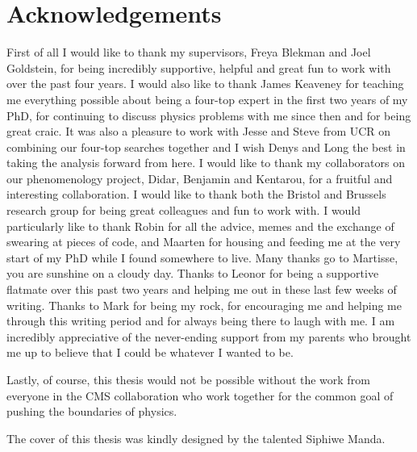 \chapter*{Acknowledgements} 

First of all I would like to thank my supervisors, Freya Blekman and Joel Goldstein, for being incredibly supportive, helpful and great fun to work with over the past four years. I would also like to thank James Keaveney for teaching me everything possible about being a four-top expert in the first two years of my PhD, for continuing to discuss physics problems with me since then and for being great craic. It was also a pleasure to work with Jesse and Steve from UCR on combining our four-top searches together and I wish Denys and Long the best in taking the analysis forward from here.
I would like to thank my collaborators on our phenomenology project, Didar, Benjamin and Kentarou, for a fruitful and interesting collaboration. I would like to thank both the Bristol and Brussels research group for being great colleagues and fun to work with. I would particularly like to thank Robin for all the advice, memes and the exchange of swearing at pieces of code, and Maarten for housing and feeding me at the very start of my PhD while I found somewhere to live. Many thanks go to Martisse, you are sunshine on a cloudy day. 
Thanks to Leonor for being a supportive flatmate over this past two years and helping me out in these last few weeks of writing. Thanks to Mark for being my rock, for encouraging me and helping me through this writing period and for always being there to laugh with me.
I am incredibly appreciative of the never-ending support from my parents who brought me up to believe that I could be whatever I wanted to be.

Lastly, of course, this thesis would not be possible without the work from everyone in the CMS collaboration who work together for the common goal of pushing the boundaries of physics.

The cover of this thesis was kindly designed by the talented Siphiwe Manda.